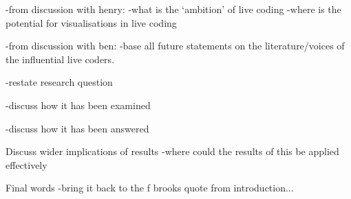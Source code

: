 -from discussion with henry:
	-what is the `ambition' of live coding
	-where is the potential for visualisations in live coding

-from discussion with ben:
	-base all future statements on the literature/voices of the influential live coders.

-restate research question

-discuss how it has been examined

-discuss how it has been answered

Discuss wider implications of results
-where could the results of this be applied effectively 




Final words
-bring it back to the f brooks quote from introduction... 

